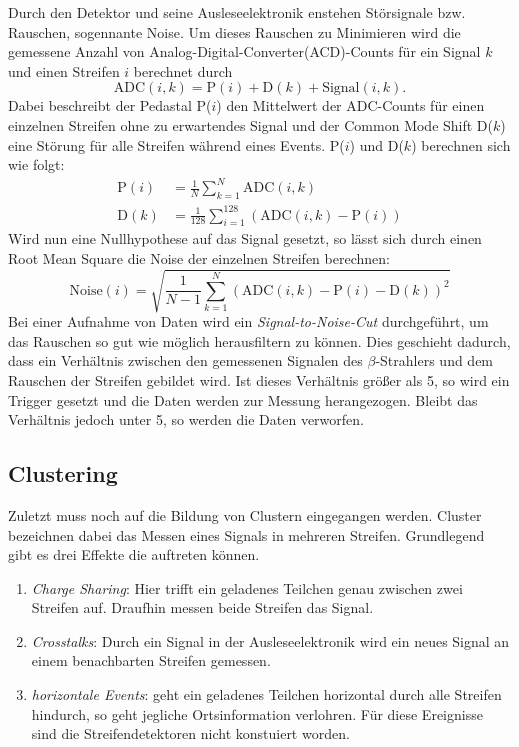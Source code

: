 Durch den Detektor und seine Ausleseelektronik enstehen Störsignale bzw. Rauschen,
sogennante Noise. Um dieses Rauschen zu Minimieren wird die gemessene Anzahl von
Analog-Digital-Converter(ACD)-Counts für ein Signal $k$ und einen Streifen $i$
berechnet durch
\begin{equation*}
  \text{ADC}(i, k) = \text{P}(i) + \text{D}(k) + \text{Signal}(i, k).
\end{equation*}
Dabei beschreibt der Pedastal P($i$) den Mittelwert der ADC-Counts für einen
einzelnen Streifen ohne zu erwartendes Signal und der Common Mode Shift D($k$)
eine Störung für alle Streifen während eines Events. P($i$) und D($k$) berechnen
sich wie folgt:
\begin{align}
  \text{P}(i) &= \frac{1}{N} \sum_{k=1}^N \text{ADC}(i, k)
  \label{eqn:pedestal} \\
  \text{D}(k) &= \frac{1}{128} \sum_{i=1}^{128} \left(\text{ADC}(i, k) - \text{P}(i) \right)
  \label{eqn:common-mode}
\end{align}
Wird nun eine Nullhypothese auf das Signal gesetzt, so lässt sich durch einen
Root Mean Square die Noise der einzelnen Streifen berechnen:
\begin{equation}
  \text{Noise}(i) = \sqrt{ \frac{1}{N-1} \sum_{k=1}^N \left(\text{ADC}(i,k) - \text{P} (i) - \text{D}(k)\right)^2 }
  \label{eqn:noise}
\end{equation}
Bei einer Aufnahme von Daten wird ein \textit{Signal-to-Noise-Cut} durchgeführt,
um das Rauschen so gut wie möglich herausfiltern zu können. Dies geschieht
dadurch, dass ein Verhältnis zwischen den gemessenen Signalen des $\beta$-Strahlers
und dem Rauschen der Streifen gebildet wird. Ist dieses Verhältnis größer als 5,
so wird ein Trigger gesetzt und die Daten werden zur Messung herangezogen. Bleibt
das Verhältnis jedoch unter 5, so werden die Daten verworfen.

\subsection{Clustering}
\label{sec:Clustering}
Zuletzt muss noch auf die Bildung von Clustern eingegangen werden. Cluster
bezeichnen dabei das Messen eines Signals in mehreren Streifen. Grundlegend
gibt es drei Effekte die auftreten können.
\begin{enumerate}
  \item \textit{Charge Sharing}: Hier trifft ein geladenes Teilchen genau
  zwischen zwei Streifen auf. Draufhin messen beide Streifen das Signal.
  \item \textit{Crosstalks}: Durch ein Signal in der Ausleseelektronik wird ein
  neues Signal an einem benachbarten Streifen gemessen.
  \item \textit{horizontale Events}: geht ein geladenes Teilchen horizontal durch
  alle Streifen hindurch, so geht jegliche Ortsinformation verlohren. Für diese
  Ereignisse sind die Streifendetektoren nicht konstuiert worden.
\end{enumerate}
